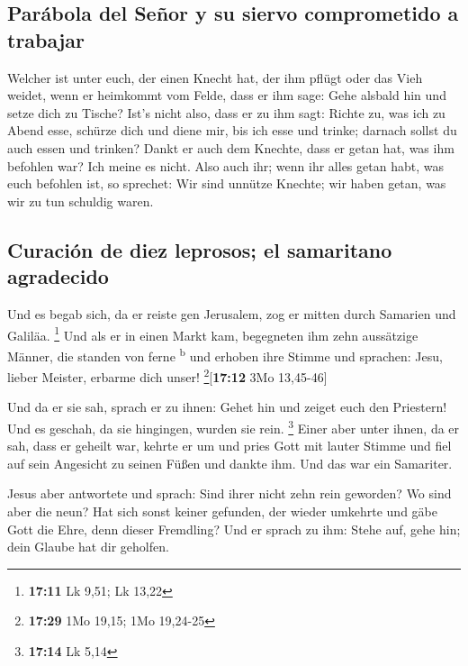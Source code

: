 \hypertarget{paruxe1bola-del-seuxf1or-y-su-siervo-comprometido-a-trabajar}{%
\subsection{Parábola del Señor y su siervo comprometido a
trabajar}\label{paruxe1bola-del-seuxf1or-y-su-siervo-comprometido-a-trabajar}}

 Welcher ist unter euch, der einen Knecht hat, der ihm
pflügt oder das Vieh weidet, wenn er heimkommt vom Felde, dass er ihm
sage: Gehe alsbald hin und setze dich zu Tische?  Ist's
nicht also, dass er zu ihm sagt: Richte zu, was ich zu Abend esse,
schürze dich und diene mir, bis ich esse und trinke; darnach sollst du
auch essen und trinken?  Dankt er auch dem Knechte, dass
er getan hat, was ihm befohlen war? Ich meine es nicht. 
Also auch ihr; wenn ihr alles getan habt, was euch befohlen ist, so
sprechet: Wir sind unnütze Knechte; wir haben getan, was wir zu tun
schuldig waren.

\hypertarget{curaciuxf3n-de-diez-leprosos-el-samaritano-agradecido}{%
\subsection{Curación de diez leprosos; el samaritano
agradecido}\label{curaciuxf3n-de-diez-leprosos-el-samaritano-agradecido}}

 Und es begab sich, da er reiste gen Jerusalem, zog er
mitten durch Samarien und Galiläa. \footnote{\textbf{17:11} Lk 9,51; Lk
  13,22}  Und als er in einen Markt kam, begegneten ihm
zehn aussätzige Männer, die standen von ferne \textsuperscript{b}
 und erhoben ihre Stimme und sprachen: Jesu, lieber
Meister, erbarme dich unser! \footnote{\textbf{17:29} 1Mo 19,15; 1Mo
  19,24-25}{[}\textbf{17:12} 3Mo 13,45-46{]}

 Und da er sie sah, sprach er zu ihnen: Gehet hin und
zeiget euch den Priestern! Und es geschah, da sie hingingen, wurden sie
rein. \footnote{\textbf{17:14} Lk 5,14}  Einer aber unter
ihnen, da er sah, dass er geheilt war, kehrte er um und pries Gott mit
lauter Stimme  und fiel auf sein Angesicht zu seinen
Füßen und dankte ihm. Und das war ein Samariter.

 Jesus aber antwortete und sprach: Sind ihrer nicht zehn
rein geworden? Wo sind aber die neun?  Hat sich sonst
keiner gefunden, der wieder umkehrte und gäbe Gott die Ehre, denn dieser
Fremdling?  Und er sprach zu ihm: Stehe auf, gehe hin;
dein Glaube hat dir geholfen.

